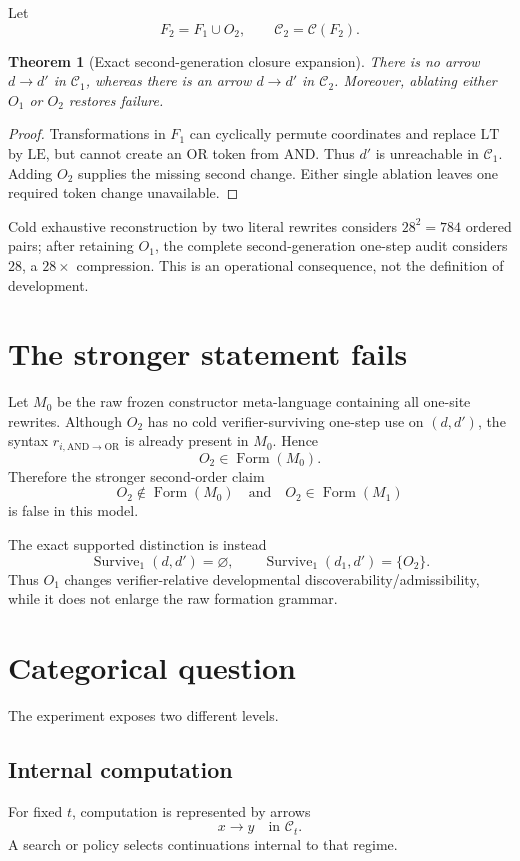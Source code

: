 \documentclass[11pt]{article}
\newtheorem{theorem}[definition]{Theorem}
\newcommand{\CapForm}{\operatorname{Form}}
\begin{document}
Let
\[
F_2=F_1\cup O_2,
\qquad
\mathcal C_2=\mathcal C(F_2).
\]

\begin{theorem}[Exact second-generation closure expansion]
There is no arrow $d\to d'$ in $\mathcal C_1$, whereas there is an arrow
$d\to d'$ in $\mathcal C_2$. Moreover, ablating either $O_1$ or $O_2$ restores failure.
\end{theorem}

\begin{proof}
Transformations in $F_1$ can cyclically permute coordinates and replace $\mathrm{LT}$ by
$\mathrm{LE}$, but cannot create an $\mathrm{OR}$ token from $\mathrm{AND}$. Thus $d'$ is
unreachable in $\mathcal C_1$. Adding $O_2$ supplies the missing second change. Either single
ablation leaves one required token change unavailable.
\end{proof}

Cold exhaustive reconstruction by two literal rewrites considers $28^2=784$ ordered pairs;
after retaining $O_1$, the complete second-generation one-step audit considers $28$, a $28\times$
compression. This is an operational consequence, not the definition of development.

\section{The stronger statement fails}

Let $M_0$ be the raw frozen constructor meta-language containing all one-site rewrites.
Although $O_2$ has no cold verifier-surviving one-step use on $(d,d')$, the syntax
$r_{i,\mathrm{AND}\to\mathrm{OR}}$ is already present in $M_0$. Hence
\[
O_2\in\CapForm(M_0).
\]
Therefore the stronger second-order claim
\[
O_2\notin\CapForm(M_0)
\quad\text{and}\quad
O_2\in\CapForm(M_1)
\]
is false in this model.

The exact supported distinction is instead
\[
\operatorname{Survive}_1(d,d')=\varnothing,
\qquad
\operatorname{Survive}_1(d_1,d')=\{O_2\}.
\]
Thus $O_1$ changes verifier-relative developmental discoverability/admissibility, while it does
not enlarge the raw formation grammar.

\section{Categorical question}

The experiment exposes two different levels.

\subsection*{Internal computation}
For fixed $t$, computation is represented by arrows
\[
x\to y\quad\text{in }\mathcal C_t.
\]
A search or policy selects continuations internal to that regime.
\end{document}
